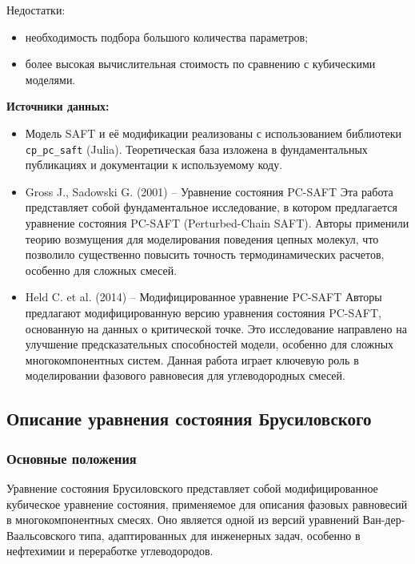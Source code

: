 \documentclass[a4paper,12pt]{article}
\begin{document}
Недостатки:
\begin{itemize}
    \item необходимость подбора большого количества параметров;
    \item более высокая вычислительная стоимость по сравнению с кубическими моделями.
\end{itemize}

\textbf{Источники данных:} \\
\begin{itemize}
	\item Модель SAFT и её модификации реализованы с использованием библиотеки \texttt{cp\_pc\_saft} (Julia). Теоретическая база изложена в фундаментальных публикациях и документации к используемому коду. \cite{cp_pc_saft2024}
    \item Gross J., Sadowski G. (2001) – Уравнение состояния PC-SAFT Эта работа представляет собой фундаментальное исследование, в котором предлагается уравнение состояния PC-SAFT (Perturbed-Chain SAFT). Авторы применили теорию возмущения для моделирования поведения цепных молекул, что позволило существенно повысить точность термодинамических расчетов, особенно для сложных смесей. \cite{Gross2001}
     \item Held C. et al. (2014) – Модифицированное уравнение PC-SAFT Авторы предлагают модифицированную версию уравнения состояния PC-SAFT, основанную на данных о критической точке. Это исследование направлено на улучшение предсказательных способностей модели, особенно для сложных многокомпонентных систем. Данная работа играет ключевую роль в моделировании фазового равновесия для углеводородных смесей. \cite{Held2014}
\end{itemize}

\subsection{Описание уравнения состояния Брусиловского}

\subsubsection{Основные положения}

Уравнение состояния Брусиловского представляет собой модифицированное кубическое уравнение состояния, применяемое для описания фазовых равновесий в многокомпонентных смесях. Оно является одной из версий уравнений Ван-дер-Ваальсовского типа, адаптированных для инженерных задач, особенно в нефтехимии и переработке углеводородов.
\end{document}
